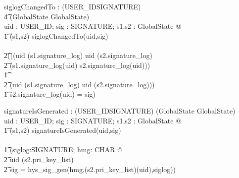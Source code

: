 \documentclass[a4paper,pdftex]{article}
\begin{document}
\begin{axdef}
siglogChangedTo : (USER\_ID\cross SIGNATURE) \fun        \\
\t4                (GlobalState \rel GlobalState)       \\
\where
\forall uid : USER\_ID; sig : SIGNATURE; s1,s2 : GlobalState @ \\
\t1 (s1,s2) \in siglogChangedTo(uid,sig)\\
\iff \\
\t2(((uid \in \dom (s1.signature\_log) \land uid \in \dom (s2.signature\_log) \\
\t2   \land (s1.signature\_log(uid) \neq  s2.signature\_log(uid)))           \\
\t1 \lor                                                                     \\
\t2 (uid \notin \dom (s1.signature\_log) \land uid \in \dom (s2.signature\_log))) \\
\t1 \land s2.signature\_log(uid) = sig)
\end{axdef}


\begin{axdef}
signatureIsGenerated : (USER\_ID\cross SIGNATURE) \fun (GlobalState \rel GlobalState) \\
\where
\forall uid : USER\_ID; sig : SIGNATURE; s1,s2 : GlobalState @          \\
\t1 (s1,s2) \in signatureIsGenerated(uid,sig)                           \\
\iff                                                                    \\
\t1     (\exists siglog:SIGNATURE; hmg: \seq CHAR @                     \\
\t2         uid \in \dom(s2.pri\_key\_list) \land                       \\
\t2         sig = hys\_sig\_gen(hmg,(s2.pri\_key\_list)(uid),siglog))   
\end{axdef}
\end{document}
